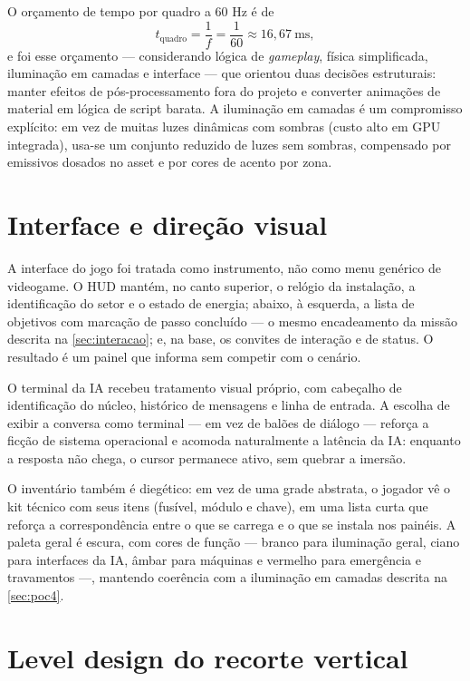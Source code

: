 O orçamento de tempo por quadro a 60 Hz é de
\begin{equation}
\label{eq:orcamento}
t_{\text{quadro}} = \frac{1}{f} = \frac{1}{60} \approx 16{,}67\ \text{ms},
\end{equation}
\noindent e foi esse orçamento --- considerando lógica de \emph{gameplay},
física simplificada, iluminação em camadas e interface --- que orientou duas
decisões estruturais: manter efeitos de pós-processamento fora do projeto e
converter animações de material em lógica de script barata. A iluminação em
camadas é um compromisso explícito: em vez de muitas luzes dinâmicas com
sombras (custo alto em GPU integrada), usa-se um conjunto reduzido de luzes
sem sombras, compensado por emissivos dosados no asset e por cores de acento
por zona.

\section{Interface e direção visual}
\label{sec:interface}

A interface do jogo foi tratada como instrumento, não como menu genérico de
videogame. O HUD mantém, no canto superior, o relógio da instalação, a
identificação do setor e o estado de energia; abaixo, à esquerda, a lista de
objetivos com marcação de passo concluído --- o mesmo encadeamento da missão
descrita na \autoref{sec:interacao}; e, na base, os convites de interação e de
status. O resultado é um painel que informa sem competir com o cenário.

O terminal da IA recebeu tratamento visual próprio, com cabeçalho de
identificação do núcleo, histórico de mensagens e linha de entrada. A escolha
de exibir a conversa como terminal --- em vez de balões de diálogo --- reforça
a ficção de sistema operacional e acomoda naturalmente a latência da IA:
enquanto a resposta não chega, o cursor permanece ativo, sem quebrar a
imersão.

O inventário também é diegético: em vez de uma grade abstrata, o jogador vê
o kit técnico com seus itens (fusível, módulo e chave), em uma lista curta que
reforça a correspondência entre o que se carrega e o que se instala nos
painéis. A paleta geral é escura, com cores de função --- branco para
iluminação geral, ciano para interfaces da IA, âmbar para máquinas e vermelho
para emergência e travamentos ---, mantendo coerência com a iluminação em
camadas descrita na \autoref{sec:poc4}.

\section{Level design do recorte vertical}
\label{sec:level_design}

